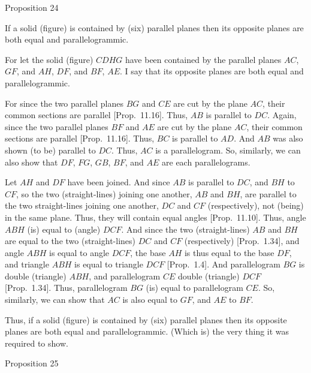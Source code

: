 
\begin{center}
{\large Proposition 24}
\end{center}

If a solid (figure) is contained by (six) parallel planes then its opposite planes
are both equal and parallelogrammic.

\epsfysize=1.5in
\centerline{}

For let the solid (figure) $CDHG$ have been contained by the parallel planes
$AC$, $GF$, and $AH$, $DF$, and $BF$, $AE$. I say that its opposite
planes are both equal and parallelogrammic.

For since the two parallel planes $BG$ and $CE$ are cut by the plane
$AC$, their common sections are parallel [Prop.~11.16]. Thus, $AB$ is parallel to $DC$.  Again, since
the two parallel planes $BF$ and $AE$ are cut by the plane
$AC$, their common sections are parallel [Prop.~11.16]. Thus,  $BC$ is parallel to $AD$. And
$AB$ was also shown (to be) parallel to $DC$. Thus, $AC$ is a parallelogram. So, similarly, we can also show that $DF$, $FG$, $GB$,
$BF$, and $AE$ are each parallelograms.

Let $AH$ and $DF$ have been joined. And since $AB$ is parallel to
$DC$, and $BH$ to $CF$, so the two (straight-lines) joining one another,
$AB$ and $BH$,
are parallel to the two straight-lines joining one another, $DC$ and
$CF$ (respectively), not (being) in the same plane. Thus, they
will contain equal angles [Prop.~11.10]. Thus,
angle $ABH$ (is) equal to (angle) $DCF$. And since the two (straight-lines)
$AB$ and $BH$ are equal to the two (straight-lines) $DC$ and $CF$ (respectively) [Prop.~1.34], and angle $ABH$ is equal to angle $DCF$, the base
$AH$ is thus equal to the base $DF$, and triangle $ABH$ is equal to
triangle $DCF$ [Prop.~1.4]. And parallelogram
$BG$ is double (triangle) $ABH$, and parallelogram $CE$
double (triangle) $DCF$ [Prop.~1.34]. Thus,
parallelogram $BG$ (is) equal to parallelogram $CE$. So, similarly,
we can show that $AC$ is also equal to $GF$, and $AE$ to $BF$.

Thus, if a solid (figure) is contained by (six) parallel planes then its opposite planes
are both equal and parallelogrammic. (Which is) the very thing it was required to
show.


\begin{center}
{\large Proposition 25}
\end{center}

